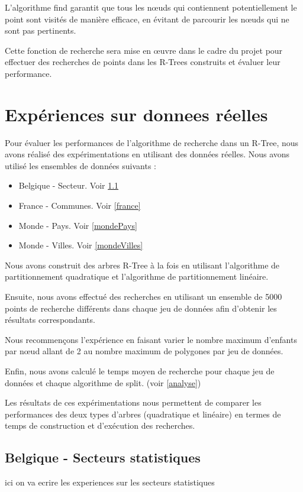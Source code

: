 \documentclass {article}
\begin{document}
L'algorithme find garantit que tous les nœuds qui contiennent potentiellement le point sont visités de manière 
efficace, en évitant de parcourir les nœuds qui ne sont pas pertinents.

Cette fonction de recherche sera mise en œuvre dans le cadre du projet pour effectuer des recherches 
de points dans les R-Trees construits et évaluer leur performance.



\section {Expériences sur donnees réelles}


Pour évaluer les performances de l'algorithme de recherche dans un R-Tree, 
nous avons réalisé des expérimentations en utilisant des données réelles. 
Nous avons utilisé les ensembles de données suivants :

\begin{itemize}

    \item Belgique - Secteur. Voir \ref{belgique}
    \item France - Communes. Voir \ref{france}
    \item Monde - Pays. Voir \ref{mondePays}
    \item Monde - Villes. Voir \ref{mondeVilles}
\end{itemize}

Nous avons construit des arbres R-Tree à la fois en utilisant l'algorithme de partitionnement quadratique 
et l'algorithme de partitionnement linéaire.

Ensuite, nous avons effectué des recherches en utilisant un ensemble de 5000 points de recherche différents 
dans chaque jeu de données afin d'obtenir les résultats correspondants.

Nous recommençons l'expérience en faisant varier le nombre maximum d'enfants par nœud allant de 2 au nombre
maximum de polygones par jeu de données.

Enfin, nous avons calculé le temps moyen de recherche pour chaque jeu de données et chaque algorithme de split.
(voir \ref{analyse})

Les résultats de ces expérimentations nous permettent de comparer les performances des deux types d'arbres 
(quadratique et linéaire) en termes de temps de construction et d'exécution des recherches.


\subsection {Belgique - Secteurs statistiques}\label{belgique}
ici on va ecrire les experiences sur les secteurs statistiques
\end{document}
